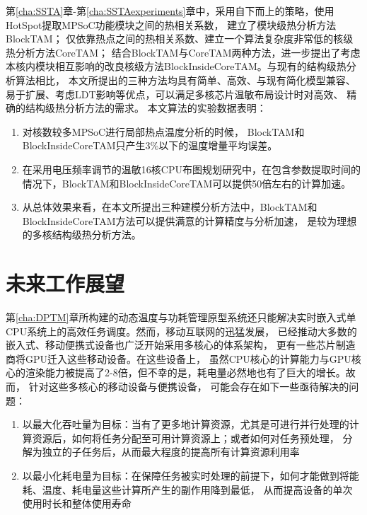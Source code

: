第\ref{cha:SSTA}章-第\ref{cha:SSTAexperiments}章中，采用自下而上的策略，使用HotSpot提取MPSoC功能模块之间的热相关系数， 建立了模块级热分析方法BlockTAM； 仅依靠热点之间的热相关系数、建立一个算法复杂度非常低的核级热分析方法CoreTAM； 结合BlockTAM与CoreTAM两种方法，进一步提出了考虑本核内模块相互影响的改良核级方法BlockInsideCoreTAM。与现有的结构级热分析算法相比， 本文所提出的三种方法均具有简单、高效、与现有简化模型兼容、易于扩展、考虑LDT影响等优点，可以满足多核芯片温敏布局设计时对高效、 精确的结构级热分析方法的需求。
本文算法的实验数据表明：
\begin{enumerate}[1)]
\item 对核数较多MPSoC进行局部热点温度分析的时候， BlockTAM和BlockInsideCoreTAM只产生3\%以下的温度增量平均误差。
\item 在采用电压频率调节的温敏16核CPU布图规划研究中，在包含参数提取时间的情况下，BlockTAM和BlockInsideCoreTAM可以提供50倍左右的计算加速。
\item 从总体效果来看，在本文所提出三种建模分析方法中，BlockTAM和BlockInsideCoreTAM方法可以提供满意的计算精度与分析加速， 是较为理想的多核结构级热分析方法。
\end{enumerate}

\section{未来工作展望}
第\ref{cha:DPTM}章所构建的动态温度与功耗管理原型系统还只能解决实时嵌入式单CPU系统上的高效任务调度。然而，移动互联网的迅猛发展， 已经推动大多数的嵌入式、移动便携式设备也广泛开始采用多核心的体系架构， 更有一些芯片制造商将GPU迁入这些移动设备。在这些设备上， 虽然CPU核心的计算能力与GPU核心的渲染能力被提高了2-8倍，但不幸的是，耗电量必然地也有了巨大的增长。故而， 针对这些多核心的移动设备与便携设备， 可能会存在如下一些亟待解决的问题：
\begin{enumerate}[1)]
\item 以最大化吞吐量为目标：当有了更多地计算资源，尤其是可进行并行处理的计算资源后，如何将任务分配至可用计算资源上；或者如何对任务预处理， 分解为独立的子任务后，从而最大程度的提高所有计算资源利用率
\item 以最小化耗电量为目标：在保障任务被实时处理的前提下，如何才能做到将能耗、温度、耗电量这些计算所产生的副作用降到最低， 从而提高设备的单次使用时长和整体使用寿命
\end{enumerate}

